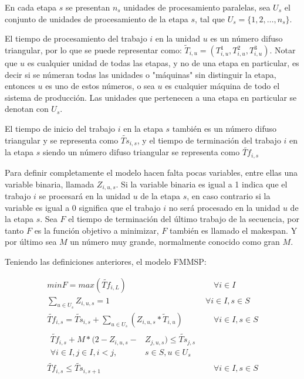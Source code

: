 \documentclass{article}
\begin{document}
\vspace{\baselineskip}
En cada etapa $s$ se presentan $n_s$ unidades de procesamiento paralelas, sea $U_s$ el conjunto de unidades de procesamiento de la etapa $s$, tal que $U_s = \{1,2,\dots,n_s\}$.

\vspace{\baselineskip}
El tiempo de procesamiento del trabajo $i$ en la unidad $u$ es un número difuso triangular, por lo que se puede representar como: $\tilde{T}_{i,u} = (T_{i,u}^{1},T_{i,u}^{2},T_{i,u}^{3})$. Notar que $u$ es cualquier unidad de todas las etapas, y no de una etapa en particular, es decir si se númeran todas las unidades o "máquinas" sin distinguir la etapa, entonces $u$ es uno de estos números, o sea $u$ es cualquier máquina de todo el sistema de producción. Las unidades que pertenecen a una etapa en particular se denotan con $U_s$.

\vspace{\baselineskip}
El tiempo de inicio del trabajo $i$ en la etapa $s$ también es un número difuso triangular y se representa como $\widetilde{Ts}_{i,s}$, y el tiempo de terminación del trabajo $i$ en la etapa $s$ siendo un número difuso triangular se representa como $\widetilde{Tf}_{i,s}$

\vspace{\baselineskip}
Para definir completamente el modelo hacen falta pocas variables, entre ellas una variable binaria, llamada $Z_{i,u,s}$. Si la variable binaria es igual a 1 indica que el trabajo $i$ se procesará en la unidad $u$ de la etapa $s$, en caso contrario si la variable es igual a 0 significa que el trabajo $i$ no será procesado en la unidad $u$ de la etapa $s$. Sea $F$ el tiempo de terminación del último trabajo de la secuencia, por tanto $F$ es la función objetivo a minimizar, $F$ también es llamado el makespan. Y por último sea $M$ un número muy grande, normalmente conocido como gran $M$.

\pagebreak

\vspace{\baselineskip}
Teniendo las definiciones anteriores, el modelo FMMSP:

\begin{align}
    \label{eqn:objF}
    min F = max(\widetilde{Tf}_{i,L}) &\quad\forall i \in I\\
    \label{eqn:binU}
    \sum_{u \in U_{s}} Z_{i,u,s} = 1 \qquad
    \qquad\quad &\forall i \in I, s \in S\\
    \label{eqn:finT}
    \widetilde{Tf}_{i,s} = \widetilde{Ts}_{i,s} + \sum_{u \in U_{s}}
    (Z_{i,u,s}*\tilde{T}_{i,u}) &\quad\forall i \in I, s \in S\\
    \begin{split}
        \label{eqn:mismaU}
        \widetilde{Tf}_{i,s} + M*(2-Z_{i,u,s}-&Z_{j,u,s}) \leq 
        \widetilde{Ts}_{j,s} \\
        \forall i \in I, j \in I, i < j,& s \in S, u \in U_{s}    
    \end{split}\\
    \label{eqn:iniSp1}
    \widetilde{Tf}_{i,s} \leq \widetilde{Ts}_{i,s+1} &\quad\forall i \in I,s \in S
\end{align}
\end{document}
